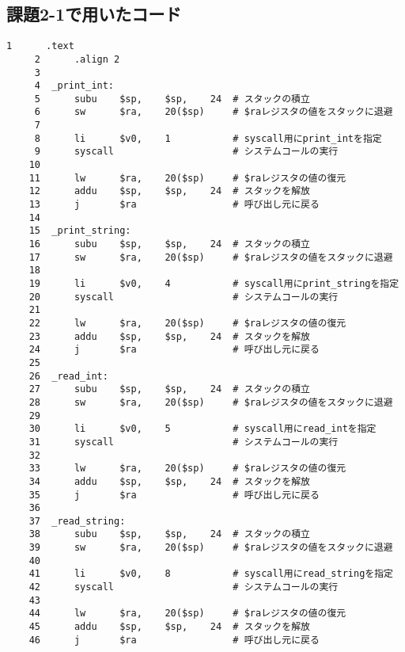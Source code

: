 \subsection{課題2-1で用いたコード} \label{sec:syscall}
\begin{Verbatim}[fontsize=\small, baselinestretch=0.8]
     1      .text
     2      .align 2
     3
     4  _print_int:
     5      subu    $sp,    $sp,    24  # スタックの積立
     6      sw      $ra,    20($sp)     # $raレジスタの値をスタックに退避
     7
     8      li      $v0,    1           # syscall用にprint_intを指定
     9      syscall                     # システムコールの実行
    10
    11      lw      $ra,    20($sp)     # $raレジスタの値の復元
    12      addu    $sp,    $sp,    24  # スタックを解放
    13      j       $ra                 # 呼び出し元に戻る
    14
    15  _print_string:
    16      subu    $sp,    $sp,    24  # スタックの積立
    17      sw      $ra,    20($sp)     # $raレジスタの値をスタックに退避
    18
    19      li      $v0,    4           # syscall用にprint_stringを指定
    20      syscall                     # システムコールの実行
    21
    22      lw      $ra,    20($sp)     # $raレジスタの値の復元
    23      addu    $sp,    $sp,    24  # スタックを解放
    24      j       $ra                 # 呼び出し元に戻る
    25
    26  _read_int:
    27      subu    $sp,    $sp,    24  # スタックの積立
    28      sw      $ra,    20($sp)     # $raレジスタの値をスタックに退避
    29
    30      li      $v0,    5           # syscall用にread_intを指定
    31      syscall                     # システムコールの実行
    32
    33      lw      $ra,    20($sp)     # $raレジスタの値の復元
    34      addu    $sp,    $sp,    24  # スタックを解放
    35      j       $ra                 # 呼び出し元に戻る
    36
    37  _read_string:
    38      subu    $sp,    $sp,    24  # スタックの積立
    39      sw      $ra,    20($sp)     # $raレジスタの値をスタックに退避
    40
    41      li      $v0,    8           # syscall用にread_stringを指定
    42      syscall                     # システムコールの実行
    43
    44      lw      $ra,    20($sp)     # $raレジスタの値の復元
    45      addu    $sp,    $sp,    24  # スタックを解放
    46      j       $ra                 # 呼び出し元に戻る
\end{Verbatim}

